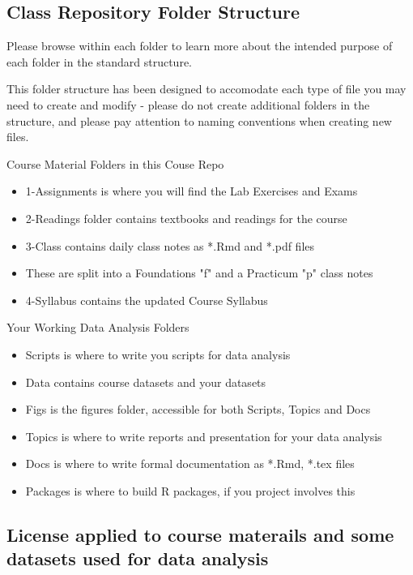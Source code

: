 \documentclass[11pt]{article} %
\begin{document}
  \subsection{Class Repository Folder Structure}

    Please browse within each folder to learn more about the intended purpose of each folder in the standard structure. 
    
    This folder structure has been designed to accomodate each type of file you may need to create and modify - please do not create additional folders in the structure, and please pay attention to naming conventions when creating new files. 
    
    Course Material Folders in this Couse Repo
    \begin{itemize}
      \item 1-Assignments is where you will find the Lab Exercises and Exams
      \item 2-Readings folder contains textbooks and readings for the course
      \item 3-Class contains daily class notes as *.Rmd and *.pdf files
      \item These are split into a Foundations "f" and a Practicum "p" class notes
      \item 4-Syllabus contains the updated Course Syllabus
    \end{itemize}
    
    Your Working Data Analysis Folders
    \begin{itemize}
      \item Scripts is where to write you scripts for data analysis
      \item Data contains course datasets and your datasets
      \item Figs is the figures folder, accessible for both Scripts, Topics and Docs
      \item Topics is where to write reports and presentation for your data analysis
      \item Docs is where to write formal documentation as *.Rmd, *.tex files
      \item Packages is where to build R packages, if you project involves this
    \end{itemize}
  
  \subsection{License applied to course materails and some datasets used for data analysis}
  
\end{document}
